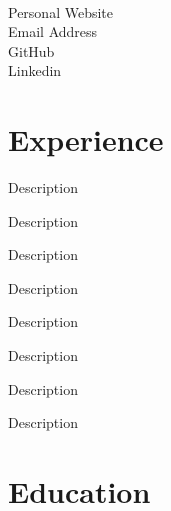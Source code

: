 \documentclass[]{single_column_resume}
\begin{document}

 { \\
	Personal Website \\
	Email Address \\
	GitHub \\
	Linkedin 
} 


\section{Experience}

\noindent{}
\hfill {}
\begin{tightemize}
    \item Description
    \item Description
\end{tightemize}
\sectionsep

\noindent{}
\hfill {}
\begin{tightemize}
    \item Description
    \item Description
\end{tightemize}
\sectionsep

\noindent{}
\hfill {}
\begin{tightemize}
    \item Description
    \item Description
\end{tightemize}
\sectionsep

\noindent{}
\hfill {}
\begin{tightemize}
    \item Description
    \item Description
\end{tightemize}
\sectionsep




\section{Education} 
\end{document}
